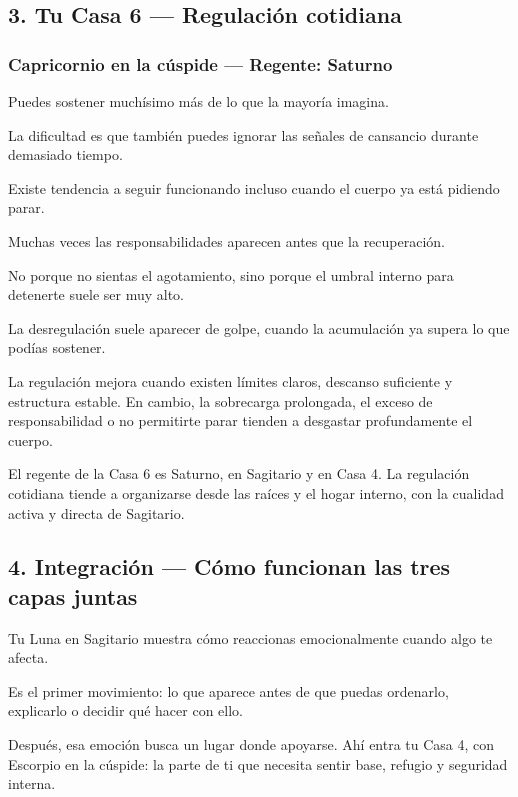 \documentclass[11pt,a4paper]{article}
\begin{document}
\subsection{3. Tu Casa 6 — Regulación cotidiana}

\subsubsection*{Capricornio en la cúspide — Regente: Saturno}

Puedes sostener muchísimo más de lo que la mayoría imagina.

La dificultad es que también puedes ignorar las señales de cansancio durante demasiado tiempo.

Existe tendencia a seguir funcionando incluso cuando el cuerpo ya está pidiendo parar.

Muchas veces las responsabilidades aparecen antes que la recuperación.

No porque no sientas el agotamiento, sino porque el umbral interno para detenerte suele ser muy alto.

La desregulación suele aparecer de golpe, cuando la acumulación ya supera lo que podías sostener.

La regulación mejora cuando existen límites claros, descanso suficiente y estructura estable. En cambio, la sobrecarga prolongada, el exceso de responsabilidad o no permitirte parar tienden a desgastar profundamente el cuerpo.

El regente de la Casa 6 es Saturno, en Sagitario y en Casa 4. La regulación cotidiana tiende a organizarse desde las raíces y el hogar interno, con la cualidad activa y directa de Sagitario.

\subsection{4. Integración — Cómo funcionan las tres capas juntas}

Tu Luna en Sagitario muestra cómo reaccionas emocionalmente cuando algo te afecta.

Es el primer movimiento: lo que aparece antes de que puedas ordenarlo, explicarlo o decidir qué hacer con ello.

Después, esa emoción busca un lugar donde apoyarse. Ahí entra tu Casa 4, con Escorpio en la cúspide: la parte de ti que necesita sentir base, refugio y seguridad interna.
\end{document}
